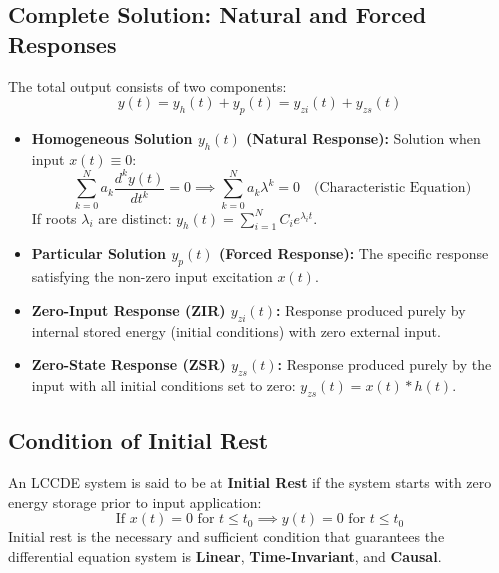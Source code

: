 \documentclass[12pt,a4paper]{article}
\begin{document}
\subsection{Complete Solution: Natural and Forced Responses}
The total output consists of two components:
\begin{equation}
  y(t) = y_h(t) + y_p(t) = y_{zi}(t) + y_{zs}(t)
\end{equation}
\begin{itemize}[topsep=2pt, itemsep=2pt]
  \item \textbf{Homogeneous Solution $y_h(t)$ (Natural Response):} Solution when input $x(t) \equiv 0$:
  \begin{equation}
    \sum_{k=0}^N a_k \frac{d^k y(t)}{dt^k} = 0 \implies \sum_{k=0}^N a_k \lambda^k = 0 \quad \text{(Characteristic Equation)}
  \end{equation}
  If roots $\lambda_i$ are distinct: $y_h(t) = \sum_{i=1}^N C_i e^{\lambda_i t}$.
  \item \textbf{Particular Solution $y_p(t)$ (Forced Response):} The specific response satisfying the non-zero input excitation $x(t)$.
  \item \textbf{Zero-Input Response (ZIR) $y_{zi}(t)$:} Response produced purely by internal stored energy (initial conditions) with zero external input.
  \item \textbf{Zero-State Response (ZSR) $y_{zs}(t)$:} Response produced purely by the input with all initial conditions set to zero: $y_{zs}(t) = x(t) * h(t)$.
\end{itemize}

\subsection{Condition of Initial Rest}
\begin{tcolorbox}[defbox, title={\textbf{Concept: Initial Rest}}]
An LCCDE system is said to be at \textbf{Initial Rest} if the system starts with zero energy storage prior to input application:
\begin{equation}
  \text{If } x(t) = 0 \text{ for } t \le t_0 \implies y(t) = 0 \text{ for } t \le t_0
\end{equation}
Initial rest is the necessary and sufficient condition that guarantees the differential equation system is \textbf{Linear}, \textbf{Time-Invariant}, and \textbf{Causal}.
\end{tcolorbox}
\end{document}
